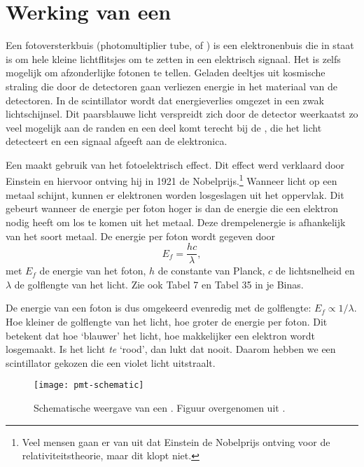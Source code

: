 \section{Werking van een \pmt}

Een fotoversterkbuis (photomultiplier tube, of \pmt) is een
elektronenbuis die in staat is om hele kleine lichtflitsjes om te zetten
in een elektrisch signaal.  Het is zelfs mogelijk om afzonderlijke fotonen
te tellen.  Geladen deeltjes uit kosmische straling die door de \hisparc
detectoren gaan verliezen energie in het materiaal van de detectoren.  In
de scintillator wordt dat energieverlies omgezet in een zwak
lichtschijnsel.  Dit paarsblauwe licht verspreidt zich door de detector
weerkaatst zo veel mogelijk aan de randen en een deel komt terecht bij de
\pmt, die het licht detecteert en een signaal afgeeft aan de \hisparc
elektronica.

Een \pmt maakt gebruik van het fotoelektrisch effect.  Dit effect werd
verklaard door Einstein en hiervoor ontving hij in 1921 de
Nobelprijs.\footnote{Veel mensen gaan er van uit dat Einstein de Nobelprijs
ontving voor de relativiteitstheorie, maar dit klopt niet.}  Wanneer licht
op een metaal schijnt, kunnen er elektronen worden losgeslagen uit het
oppervlak.  Dit gebeurt wanneer de energie per foton hoger is dan de
energie die een elektron nodig heeft om los te komen uit het metaal.  Deze
drempelenergie is afhankelijk van het soort metaal.  De energie per foton
wordt gegeven door
\begin{equation}
E_f = \frac{hc}{\lambda},
\end{equation}
met $E_f$ de energie van het foton, $h$ de constante van Planck, $c$ de
lichtsnelheid en $\lambda$ de golflengte van het licht.  Zie ook Tabel 7
en Tabel 35 in je Binas.

De energie van een foton is dus omgekeerd evenredig met de golflengte:
$E_f \propto 1/\lambda$.  Hoe kleiner de golflengte van het licht, hoe
groter de energie per foton.  Dit betekent dat hoe `blauwer' het licht,
hoe makkelijker een elektron wordt losgemaakt.  Is het licht \emph{te}
`rood', dan lukt dat nooit.  Daarom hebben we een scintillator gekozen die
een violet licht uitstraalt.

\begin{figure}
\centering
\texttt{[image: pmt-schematic]}
\caption{Schematische weergave van een \pmt.  Figuur overgenomen uit
\cite{hamamatsu}.}
\label{fig:pmt}
\end{figure}

